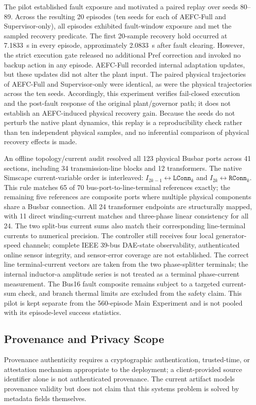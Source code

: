 The pilot established fault exposure and motivated a paired replay over seeds 80--89. Across the resulting 20 episodes (ten seeds for each of AEFC-Full and Supervisor-only), all episodes exhibited fault-window exposure and met the sampled recovery predicate. The first 20-sample recovery hold occurred at 7.1833~s in every episode, approximately 2.0833~s after fault clearing. However, the strict execution gate released no additional Pref correction and invoked no backup action in any episode. AEFC-Full recorded internal adaptation updates, but these updates did not alter the plant input. The paired physical trajectories of AEFC-Full and Supervisor-only were identical, as were the physical trajectories across the ten seeds. Accordingly, this experiment verifies fail-closed execution and the post-fault response of the original plant/governor path; it does not establish an AEFC-induced physical recovery gain. Because the seeds do not perturb the native plant dynamics, this replay is a reproducibility check rather than ten independent physical samples, and no inferential comparison of physical recovery effects is made.

An offline topology/current audit resolved all 123 physical Busbar ports across 41 sections, including 34 transmission-line blocks and 12 transformers. The native Simscape current-variable order is interleaved: \(I_{2k-1}\leftrightarrow\texttt{LConn}_k\) and \(I_{2k}\leftrightarrow\texttt{RConn}_k\). This rule matches 65 of 70 bus-port-to-line-terminal references exactly; the remaining five references are composite ports where multiple physical components share a Busbar connection. All 24 transformer endpoints are structurally mapped, with 11 direct winding-current matches and three-phase linear consistency for all 24. The two split-bus current sums also match their corresponding line-terminal currents to numerical precision. The controller still receives four local generator-speed channels; complete IEEE 39-bus DAE-state observability, authenticated online sensor integrity, and sensor-error coverage are not established. The correct line terminal-current vectors are taken from the two phase-splitter terminals; the internal inductor-a amplitude series is not treated as a terminal phase-current measurement. The Bus16 fault composite remains subject to a targeted current-sum check, and branch thermal limits are excluded from the safety claim. This pilot is kept separate from the 560-episode Main Experiment and is not pooled with its episode-level success statistics.

\subsection{Provenance and Privacy Scope}
Provenance authenticity requires a cryptographic authentication, trusted-time, or attestation mechanism appropriate to the deployment; a client-provided source identifier alone is not authenticated provenance. The current artifact models provenance validity but does not claim that this systems problem is solved by metadata fields themselves.

